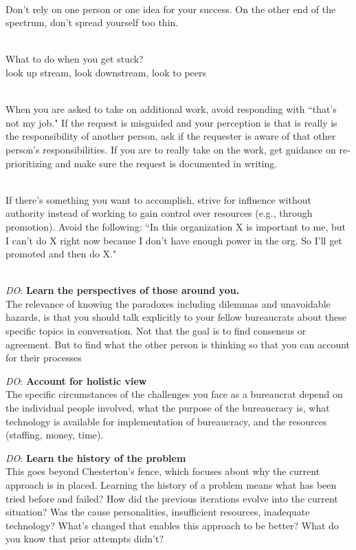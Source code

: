 \ \\

Don't rely on one person or one idea for your success. On the other end of the spectrum, don't spread yourself too thin. 

\ \\

What to do when you get stuck?\\
look up stream, look downstream, look to peers

\ \\

When you are asked to take on additional work, avoid responding with ``that's not my job." If the request is misguided and your perception is that is really is the responsibility of another person, ask if the requester is aware of that other person's responsibilities. If you are to really take on the work, get guidance on re-prioritizing and make sure the request is documented in writing. 

\ \\

If there's something you want to accomplish, strive for influence without authority instead of working to gain control over resources (e.g., through promotion). Avoid the following: ``In this organization X is important to me, but I can't do X right now because I don't have enough power in the org. So I'll get promoted and then do X."

\ \\



\textit{DO}: \textbf{Learn the perspectives of those around you.}\\
The relevance of knowing the paradoxes including dilemmas and unavoidable hazards, is that you should talk explicitly to your fellow bureaucrats about these specific topics in conversation. Not that the goal is to find consensus or agreement. But to find what the other person is thinking so that you can account for their processes


\textit{DO}: \textbf{Account for holistic view}\\
The specific circumstances of the challenges you face as a bureaucrat depend on the individual people involved, what the purpose of the bureaucracy is, what technology is available for implementation of bureaucracy, and the resources (staffing, money, time). 

\textit{DO}: \textbf{Learn the history of the problem}\\
This goes beyond Chesterton's fence, which focuses about why the current approach is in placed. Learning the history of a problem means what has been tried before and failed? How did the previous iterations evolve into the current situation? Was the cause personalities, insufficient resources, inadequate technology? What's changed that enables this approach to be better? What do you know that prior attempts didn't?

